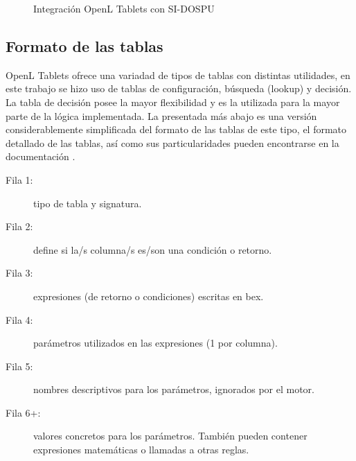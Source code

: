 \begin{figure*}
    \centering
    \caption{Integración OpenL Tablets con SI-DOSPU}
    \label{fig:integration}
\end{figure*}

\subsection{Formato de las tablas}
OpenL Tablets ofrece una variadad de tipos de tablas con distintas utilidades, en este trabajo se hizo uso de tablas de configuración, búsqueda (lookup) y decisión. La tabla de decisión posee la mayor flexibilidad y es la utilizada para la mayor parte de la lógica implementada. La presentada más abajo es una versión considerablemente simplificada del formato de las tablas de este tipo, el formato detallado de las tablas, así como sus particularidades pueden encontrarse en la documentación \cite{openl-decision-table}.

\begin{description}
    \item[Fila 1: ] tipo de tabla y signatura.
    \item[Fila 2: ] define si la/s columna/s es/son una condición o retorno.
    \item[Fila 3: ] expresiones (de retorno o condiciones) escritas en \acrshort{bex}.
    \item[Fila 4: ] parámetros utilizados en las expresiones (1 por columna).
    \item[Fila 5: ] nombres descriptivos para los parámetros, ignorados por el motor.
    \item[Fila 6+:] valores concretos para los parámetros. También pueden contener expresiones matemáticas o llamadas a otras reglas.
\end{description}

